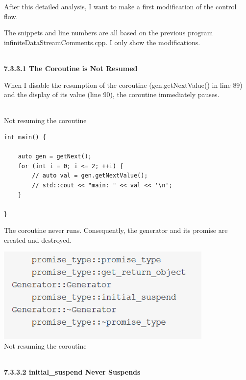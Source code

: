 After this detailed analysis, I want to make a first modification of the control flow.


The snippets and line numbers are all based on the previous program infiniteDataStreamComments.cpp. I only show the modifications.

\hspace*{\fill} \\ %
\noindent
\textbf{7.3.3.1\hspace{0.2cm} The Coroutine is Not Resumed}

When I disable the resumption of the coroutine (gen.getNextValue() in line 89) and the display of its value (line 90), the coroutine immediately pauses.

\hspace*{\fill} \\ %
\noindent
Not resuming the coroutine
\begin{lstlisting}[style=styleCXX]
int main() {
	
	auto gen = getNext();
	for (int i = 0; i <= 2; ++i) {
		// auto val = gen.getNextValue();
		// std::cout << "main: " << val << '\n';
	}

}
\end{lstlisting}

The coroutine never runs. Consequently, the generator and its promise are created and destroyed.

\begin{center}
\includegraphics[width=0.8\textwidth]{content/3/chapter7/images/15.png}\\
Not resuming the coroutine
\end{center}

\hspace*{\fill} \\ %
\noindent
\textbf{7.3.3.2\hspace{0.2cm} initial\_suspend Never Suspends}


